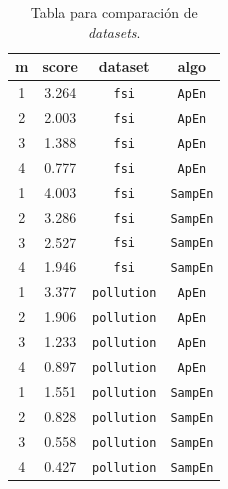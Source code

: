 \documentclass[a4paper,12pt]{article}
\begin{document}
\begin{table}[H]
\centering
\begin{tabular}{cccc}
\hline
\textbf{m} & \textbf{score} & \textbf{dataset} & \textbf{algo} \\ \hline
1          & 3.264          & \texttt{fsi}              & \texttt{ApEn}          \\
2          & 2.003          & \texttt{fsi}              & \texttt{ApEn}          \\
3          & 1.388          & \texttt{fsi}              & \texttt{ApEn}          \\
4          & 0.777          & \texttt{fsi}              & \texttt{ApEn}          \\
1          & 4.003          & \texttt{fsi}              & \texttt{SampEn}        \\
2          & 3.286          & \texttt{fsi}              & \texttt{SampEn}        \\
3          & 2.527          & \texttt{fsi}              & \texttt{SampEn}        \\
4          & 1.946          & \texttt{fsi}              & \texttt{SampEn}        \\
1          & 3.377          & \texttt{pollution}        & \texttt{ApEn}          \\
2          & 1.906          & \texttt{pollution}        & \texttt{ApEn}          \\
3          & 1.233          & \texttt{pollution}        & \texttt{ApEn}          \\
4          & 0.897          & \texttt{pollution}        & \texttt{ApEn}          \\
1          & 1.551          & \texttt{pollution}        & \texttt{SampEn}        \\
2          & 0.828          & \texttt{pollution}        & \texttt{SampEn}        \\
3          & 0.558          & \texttt{pollution}        & \texttt{SampEn}        \\
4          & 0.427          & \texttt{pollution}        & \texttt{SampEn}        \\ \hline
\end{tabular}
\caption{Tabla para comparación de \textit{datasets}.}
\label{tab:dataset_comparison}
\end{table}
\end{document}
